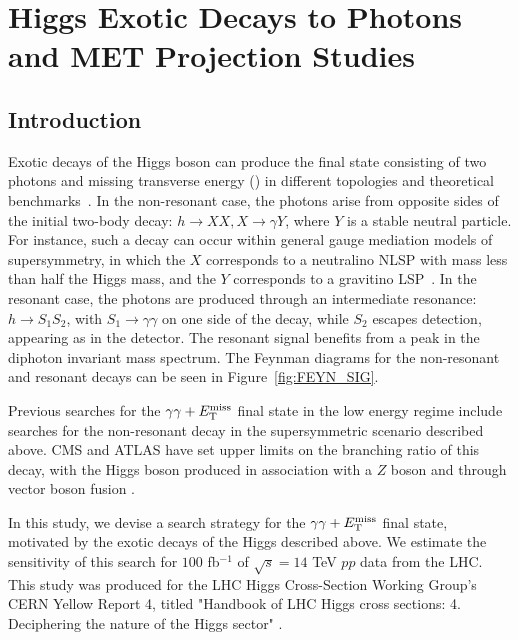 \section{Higgs Exotic Decays to Photons and MET Projection Studies}
\subsection{Introduction}

Exotic decays of the Higgs boson can produce the final state consisting of two photons and missing transverse energy (\MET) in different topologies and theoretical benchmarks~\cite{Curtin:2013fra}. 
%
In the non-resonant case, the photons arise from opposite sides of the initial two-body decay: $h\to XX, X\to\gamma Y$, where $Y$ is a stable neutral particle. For instance, such a decay can occur within general gauge mediation models of supersymmetry, in which the $X$ corresponds to a neutralino NLSP with mass less than half the Higgs mass, and the $Y$ corresponds to a gravitino LSP~\cite{Djouadi:1997gw, Mason:2009qh, Petersson:2012dp}.
%
In the resonant case, the photons are produced through an intermediate resonance: $h\to S_1 S_2$, with $S_1 \to\gamma\gamma$ on one side of the decay, while $S_2$ escapes detection, appearing as \MET in the detector. The resonant signal benefits from a peak in the diphoton invariant mass spectrum. 
The Feynman diagrams for the non-resonant and resonant decays can be seen in Figure~\ref{fig:FEYN_SIG}.

Previous searches for the $\gamma\gamma+E_{\mathrm{T}}^{\text{miss}}$ final state in the low energy regime include searches for the non-resonant decay in the supersymmetric scenario described above. CMS and ATLAS have set upper limits on the branching ratio of this decay, with the Higgs boson produced in association with a $Z$ boson \cite{lowmonophoton} and through vector boson fusion \cite{ATLAS:2015bra}.

In this study, we devise a search strategy for the $\gamma\gamma+E_{\mathrm{T}}^{\text{miss}}$ final state, motivated by the exotic decays of the Higgs described above. We estimate the sensitivity of this search for $100$ fb$^{-1}$ of $\sqrt{s}=14$ TeV $pp$ data from the LHC. This study was produced for the LHC Higgs Cross-Section Working Group's CERN Yellow Report 4, titled "Handbook of LHC Higgs cross sections: 4. Deciphering the nature of the Higgs sector" \cite{lhchxswg_yr4}. 



